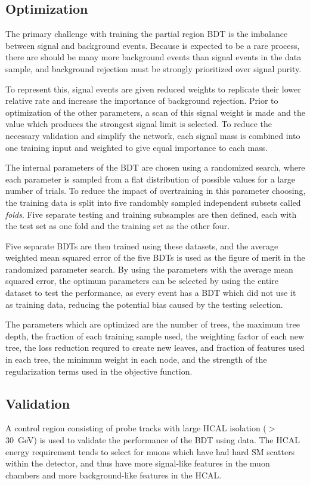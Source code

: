 \subsection{Optimization}
The primary challenge with training the partial region BDT is the imbalance between signal and background events. 
Because \dbrem is expected to be a rare process, there are should be many more background events than signal events in the data sample, and background rejection must be strongly prioritized over signal purity.

To represent this, signal events are given reduced weights to replicate their lower relative rate and increase the importance of background rejection.
Prior to optimization of the other parameters, a scan of this signal weight is made and the value which produces the strongest signal limit is selected.
To reduce the necessary validation and simplify the network, each signal mass is combined into one training input and weighted to give equal importance to each mass.

The internal parameters of the BDT are chosen using a randomized search, where each parameter is sampled from a flat distribution of possible values for a large number of trials.
To reduce the impact of overtraining in this parameter choosing, the training data is split into five randombly sampled independent subsets called \emph{folds}.
Five separate testing and training subsamples are then defined, each with the test set as one fold and the training set as the other four.

Five separate BDTs are then trained using these datasets, and the average weighted mean squared error of the five BDTs is used as the figure of merit in the randomized parameter search.
By using the parameters with the average mean squared error, the optimum parameters can be selected by using the entire dataset to test the performance, as every event has a BDT which did not use it as training data, reducing the potential bias caused by the testing selection.

The parameters which are optimized are the number of trees, the maximum tree depth, the fraction of each training sample used, the weighting factor of each new tree, the loss reduction requred to create new leaves, and fraction of features used in each tree, the minimum weight in each node, and the strength of the regularization terms used in the objective function.

\subsection{Validation}
A control region consisting of probe tracks with large HCAL isolation ($>$\SI{30}{\giga\eV}) is used to validate the performance of the BDT using data.
The HCAL energy requirement tends to select for muons which have had hard SM scatters within the detector, and thus have more signal-like features in the muon chambers and more background-like features in the HCAL.

